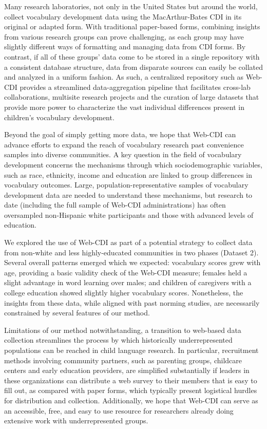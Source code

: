\documentclass[
  english,
  ,man,floatsintext]{apa6}
\begin{document}
Many research laboratories, not only in the United States but around the world, collect vocabulary development data using the MacArthur-Bates CDI in its original or adapted form. With traditional paper-based forms, combining insights from various research groups can prove challenging, as each group may have slightly different ways of formatting and managing data from CDI forms. By contrast, if all of these groups' data come to be stored in a single repository with a consistent database structure, data from disparate sources can easily be collated and analyzed in a uniform fashion. As such, a centralized repository such as Web-CDI provides a streamlined data-aggregation pipeline that facilitates cross-lab collaborations, multisite research projects and the curation of large datasets that provide more power to characterize the vast individual differences present in children's vocabulary development.

Beyond the goal of simply getting more data, we hope that Web-CDI can advance efforts to expand the reach of vocabulary research past convenience samples into diverse communities. A key question in the field of vocabulary development concerns the mechanisms through which sociodemographic variables, such as race, ethnicity, income and education are linked to group differences in vocabulary outcomes. Large, population-representative samples of vocabulary development data are needed to understand these mechanisms, but research to date (including the full sample of Web-CDI administrations) has often oversampled non-Hispanic white participants and those with advanced levels of education.

We explored the use of Web-CDI as part of a potential strategy to collect data from non-white and less highly-educated communities in two phases (Dataset 2). Several overall patterns emerged which we expected: vocabulary scores grew with age, providing a basic validity check of the Web-CDI measure; females held a slight advantage in word learning over males; and children of caregivers with a college education showed slightly higher vocabulary scores. Nonetheless, the insights from these data, while aligned with past norming studies, are necessarily constrained by several features of our method.

Limitations of our method notwithstanding, a transition to web-based data collection streamlines the process by which historically underrepresented populations can be reached in child language research. In particular, recruitment methods involving community partners, such as parenting groups, childcare centers and early education providers, are simplified substantially if leaders in these organizations can distribute a web survey to their members that is easy to fill out, as compared with paper forms, which typically present logistical hurdles for distribution and collection. Additionally, we hope that Web-CDI can serve as an accessible, free, and easy to use resource for researchers already doing extensive work with underrepresented groups.
\end{document}
